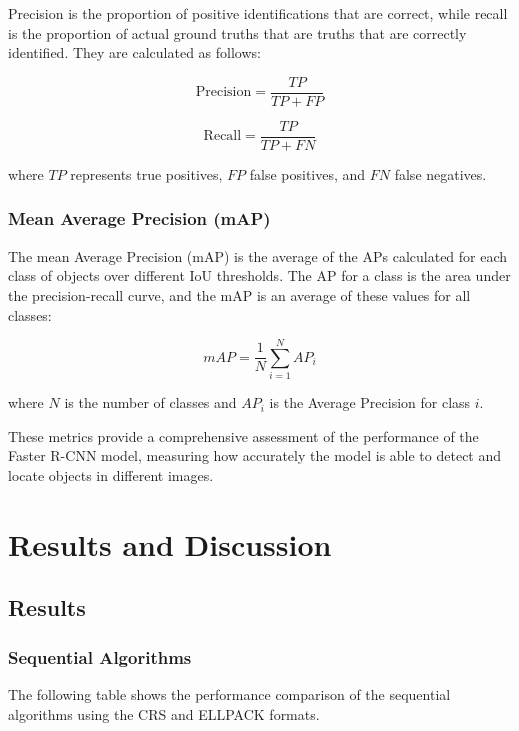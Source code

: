 \documentclass[12pt,oneside]{book} %
\begin{document}
Precision is the proportion of positive identifications that are correct, while
recall is the proportion of actual ground truths that are truths that are
correctly identified. They are calculated as follows:

\begin{equation}
    \text{Precision} = \frac{TP}{TP + FP}
\end{equation}

\begin{equation}
    \text{Recall} = \frac{TP}{TP + FN}
\end{equation}

where $TP$ represents true positives, $FP$ false positives, and $FN$ false
negatives.

\subsection{Mean Average Precision (mAP)}

The mean Average Precision (mAP) is the average of the APs calculated for each
class of objects over different IoU thresholds. The AP for a class is the area
under the precision-recall curve, and the mAP is an average of these values for
all classes:

\begin{equation}
    mAP = \frac{1}{N} \sum_{i=1}^{N} AP_i
\end{equation}

where $N$ is the number of classes and $AP_i$ is the Average Precision for
class $i$.

These metrics provide a comprehensive assessment of the performance of the
Faster R-CNN model, measuring how accurately the model is able to detect and
locate objects in different images.

\chapter{Results and Discussion}
\section{Results}

\subsection{Sequential Algorithms}

The following table shows the performance comparison of the sequential
algorithms using the CRS and ELLPACK formats.
\end{document}
